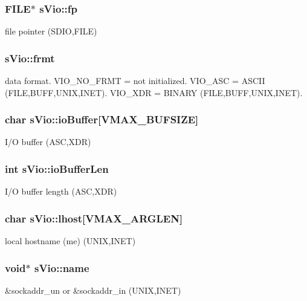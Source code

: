 \subsubsection[{fp}]{\setlength{\rightskip}{0pt plus 5cm}F\-I\-L\-E$\ast$ s\-Vio\-::fp}\label{a00002_a6ac2f825edaf90c684faebbb17ad67d4}
file pointer (S\-D\-I\-O,F\-I\-L\-E) 
\subsubsection[{frmt}]{ s\-Vio\-::frmt}\label{a00002_a6c29ebe4584937b74a3c0b449310f1ac}
data format. V\-I\-O\-\_\-\-N\-O\-\_\-\-F\-R\-M\-T = not initialized. V\-I\-O\-\_\-\-A\-S\-C = A\-S\-C\-I\-I (F\-I\-L\-E,B\-U\-F\-F,U\-N\-I\-X,I\-N\-E\-T). V\-I\-O\-\_\-\-X\-D\-R = B\-I\-N\-A\-R\-Y (F\-I\-L\-E,B\-U\-F\-F,U\-N\-I\-X,I\-N\-E\-T). 
\subsubsection[{io\-Buffer}]{\setlength{\rightskip}{0pt plus 5cm}char s\-Vio\-::io\-Buffer[{\bf V\-M\-A\-X\-\_\-\-B\-U\-F\-S\-I\-Z\-E}]}\label{a00002_aa782f06576338c4bf32af13ffa76b455}
I/\-O buffer (A\-S\-C,X\-D\-R) 
\subsubsection[{io\-Buffer\-Len}]{\setlength{\rightskip}{0pt plus 5cm}int s\-Vio\-::io\-Buffer\-Len}\label{a00002_a319b82ac4590beb7b7971822fc5ab471}
I/\-O buffer length (A\-S\-C,X\-D\-R) 
\subsubsection[{lhost}]{\setlength{\rightskip}{0pt plus 5cm}char s\-Vio\-::lhost[{\bf V\-M\-A\-X\-\_\-\-A\-R\-G\-L\-E\-N}]}\label{a00002_a8bb72a4f63380102527e19b592f70acc}
local hostname (me) (U\-N\-I\-X,I\-N\-E\-T) 
\subsubsection[{name}]{\setlength{\rightskip}{0pt plus 5cm}void$\ast$ s\-Vio\-::name}\label{a00002_ab949cc025dba7a425e9a483d7b9452be}
\&sockaddr\-\_\-un or \&sockaddr\-\_\-in (U\-N\-I\-X,I\-N\-E\-T) 
